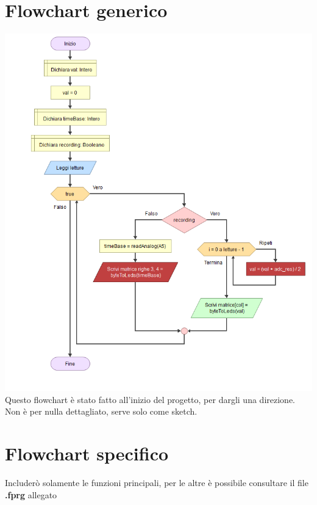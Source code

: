 \documentclass{article}
\begin{document}
\section{Flowchart generico}
\includegraphics[scale=.4]{genericFlowchart.png}
Questo flowchart è stato fatto all'inizio del progetto, per dargli una direzione.
Non è per nulla dettagliato, serve solo come sketch.

\section{Flowchart specifico}
Includerò solamente le funzioni principali, per le altre è possibile consultare il file \textbf{.fprg} allegato
\end{document}
